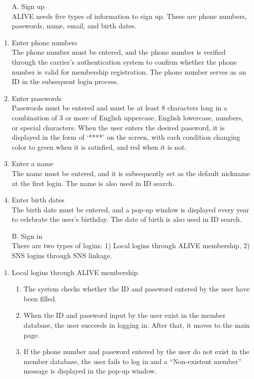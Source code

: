 \documentclass[conference]{IEEEtran}
\begin{document}
\begin{itemize}
    \item [A.] Sign up \\
    ALIVE needs five types of information to sign up. These are phone numbers, passwords, name, email, and birth dates.
\end{itemize}
\begin{enumerate}
    \item Enter phone numbers \\
    The phone number must be entered, and the phone number is verified through the carrier’s authentication system to confirm whether the phone number is valid for membership registration. The phone number serves as an ID in the subsequent login process.

    \item Enter passwords \\
    Passwords must be entered and must be at least 8 characters long in a combination of 3 or more of English uppercase, English lowercase, numbers, or special characters. When the user enters the desired password, it is displayed in the form of ‘****’ on the screen, with each condition changing color to green when it is satisfied, and red when it is not.

    \item Enter a name \\
    The name must be entered, and it is subsequently set as the default nickname at the first login. The name is also used in ID search.

    \item Enter birth dates \\
    The birth date must be entered, and a pop-up window is displayed every year to celebrate the user's birthday. The date of birth is also used in ID search. \\
\end{enumerate}

\begin{itemize}
    \item [B.] Sign in \\
    There are two types of logins: 1) Local logins through ALIVE membership, 2) SNS logins through SNS linkage.
\end{itemize}

\begin{enumerate}
    \item Local logins through ALIVE membership
    \begin{enumerate}
        \item The system checks whether the ID and password entered by the user have been filled.
        \item When the ID and password input by the user exist in the member database, the user succeeds in logging in. After that, it moves to the main page.
        \item If the phone number and password entered by the user do not exist in the member database, the user fails to log in and a “Non-existent member” message is displayed in the pop-up window. \\
    \end{enumerate}
\end{enumerate}
\end{document}
